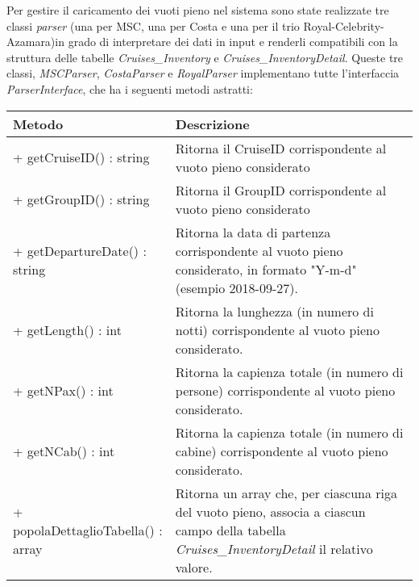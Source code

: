 Per gestire il caricamento dei vuoti pieno nel sistema sono state realizzate tre classi \textit{parser} (una per MSC, una per Costa e una per il trio Royal-Celebrity-Azamara)in grado di interpretare dei dati in input e renderli compatibili con la struttura delle tabelle \textit{Cruises\_Inventory} e \textit{Cruises\_InventoryDetail}. Queste tre classi, \textit{MSCParser}, \textit{CostaParser} e \textit{RoyalParser} implementano tutte l'interfaccia \textit{ParserInterface}, che ha i seguenti metodi astratti:
\begin{center}
	\def\arraystretch{1.5}
	\begin{tabularx}{\columnwidth}{XX}
		\hline
		\textbf{Metodo} & \textbf{Descrizione} \\ \hline
		+ getCruiseID() : string & Ritorna il CruiseID corrispondente al vuoto pieno considerato\\
		\hline
		+ getGroupID() : string & Ritorna il GroupID corrispondente al vuoto pieno considerato\\
		\hline
		+ getDepartureDate() : string & Ritorna la data di partenza corrispondente al vuoto pieno considerato, in formato "Y-m-d" (esempio 2018-09-27).\\
		\hline
		+ getLength() : int & Ritorna la lunghezza (in numero di notti) corrispondente al vuoto pieno considerato.\\
		\hline
		+ getNPax() : int & Ritorna la capienza totale (in numero di persone) corrispondente al vuoto pieno considerato.\\
		\hline
		+ getNCab() : int & Ritorna la capienza totale (in numero di cabine) corrispondente al vuoto pieno considerato.\\
		\hline
		+ popolaDettaglioTabella() : array & Ritorna un array che, per ciascuna riga del vuoto pieno, associa a ciascun campo della tabella \textit{Cruises\_InventoryDetail} il relativo valore.\\
		\hline
	\end{tabularx}
\end{center}